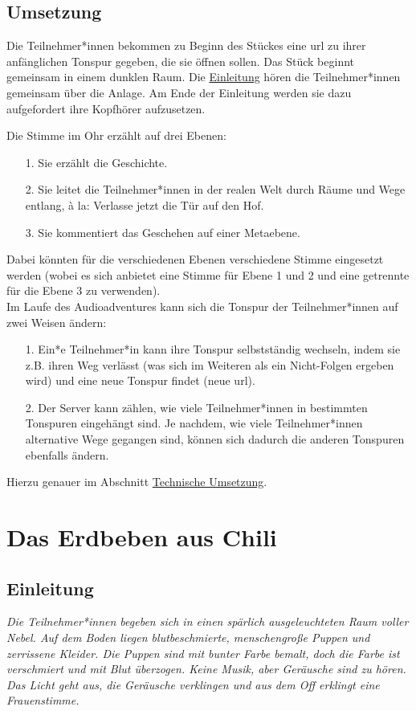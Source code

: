\documentclass[a4paper, 12pt]{article}
\begin{document}
\subsection{Umsetzung}
Die Teilnehmer*innen bekommen zu Beginn des Stückes eine url zu ihrer anfänglichen Tonspur gegeben, die sie öffnen sollen.
Das Stück beginnt gemeinsam in einem dunklen Raum.
Die \hyperref[einleitung]{Einleitung} hören die Teilnehmer*innen gemeinsam über die Anlage.
Am Ende der Einleitung werden sie dazu aufgefordert ihre Kopfhörer aufzusetzen.

Die \glqq Stimme im Ohr\grqq{} erzählt auf drei Ebenen:
\begin{itemize}
    \item[1.] Sie erzählt die Geschichte.
    \item[2.] Sie leitet die Teilnehmer*innen in der \glqq realen Welt\grqq{} durch Räume und Wege entlang, à la: \glqq Verlasse jetzt die Tür auf den Hof\grqq .
    \item[3.] Sie kommentiert das Geschehen auf einer Metaebene.
\end{itemize}
Dabei könnten für die verschiedenen Ebenen verschiedene Stimme eingesetzt werden (wobei es sich anbietet eine Stimme für Ebene 1 und 2 und eine getrennte für die Ebene 3 zu verwenden).\\

Im Laufe des Audioadventures kann sich die Tonspur der Teilnehmer*innen auf zwei Weisen ändern:
\begin{itemize}
    \item[1.] Ein*e Teilnehmer*in kann ihre Tonspur selbstständig wechseln, indem sie z.B. ihren Weg verlässt (was sich im Weiteren als ein Nicht-Folgen ergeben wird) und eine neue Tonspur findet (neue url).
    \item[2.] Der Server kann zählen, wie viele Teilnehmer*innen in bestimmten Tonspuren \glqq eingehängt\grqq{} sind. Je nachdem, wie viele Teilnehmer*innen alternative Wege gegangen sind, können sich dadurch die anderen Tonspuren ebenfalls ändern.
\end{itemize}
Hierzu genauer im Abschnitt \hyperref[technische_umsetzung]{Technische Umsetzung}.


\section{Das Erdbeben aus Chili}

\subsection{Einleitung}\label{einleitung}
\textit{Die Teilnehmer*innen begeben sich in einen spärlich ausgeleuchteten Raum voller Nebel. 
Auf dem Boden liegen blutbeschmierte, menschengroße Puppen und zerrissene Kleider. 
Die Puppen sind mit bunter Farbe bemalt, doch die Farbe ist verschmiert und mit Blut überzogen. Keine Musik, aber Geräusche sind zu hören. 
Das Licht geht aus, die Geräusche verklingen und aus dem Off erklingt eine Frauenstimme.}\\
\end{document}
